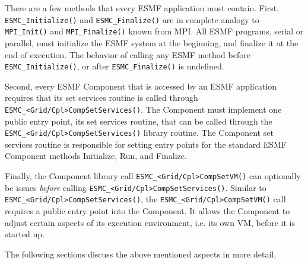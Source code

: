 %

There are a few methods that every ESMF application must contain. First,
{\tt ESMC\_Initialize()} and {\tt ESMC\_Finalize()} are in complete analogy 
to {\tt MPI\_Init()} and {\tt MPI\_Finalize()} known from MPI. All ESMF
programs, serial or parallel, must initialize the ESMF system at the beginning,
and finalize it at the end of execution. The behavior of calling any
ESMF method before {\tt ESMC\_Initialize()}, or after {\tt ESMC\_Finalize()}
is undefined.

Second, every ESMF Component that is accessed by an ESMF application requires
that its set services routine is called through
{\tt ESMC\_<Grid/Cpl>CompSetServices()}. The Component must implement
one public entry point, its set services routine, that can be called
through the {\tt ESMC\_<Grid/Cpl>CompSetServices()} library routine. The
Component set services routine is responsible for setting entry points
for the standard ESMF Component methods Initialize, Run, and Finalize.

Finally, the Component library call {\tt ESMC\_<Grid/Cpl>CompSetVM()} can
optionally be issues {\em before} calling
{\tt ESMC\_<Grid/Cpl>CompSetServices()}. Similar to 
{\tt ESMC\_<Grid/Cpl>CompSetServices()}, the 
\newline
{\tt ESMC\_<Grid/Cpl>CompSetVM()}
call requires a public entry point into the Component. It allows the Component
to adjust certain aspects of its execution environment, i.e. its own VM, before
it is started up.

The following sections discuss the above mentioned aspects in more detail.
